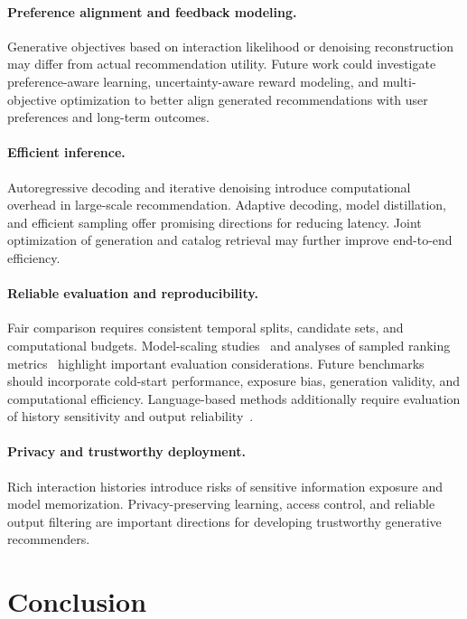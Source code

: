 \documentclass[sigconf,nonacm]{acmart}
\begin{document}
\paragraph{Preference alignment and feedback modeling.}
Generative objectives based on interaction likelihood
or denoising reconstruction may differ from actual
recommendation utility. Future work could investigate
preference-aware learning, uncertainty-aware reward
modeling, and multi-objective optimization to better
align generated recommendations with user preferences
and long-term outcomes.

\paragraph{Efficient inference.}
Autoregressive decoding and iterative denoising introduce
computational overhead in large-scale recommendation.
Adaptive decoding, model distillation, and efficient
sampling offer promising directions for reducing latency.
Joint optimization of generation and catalog retrieval
may further improve end-to-end efficiency.

\paragraph{Reliable evaluation and reproducibility.}
Fair comparison requires consistent temporal splits,
candidate sets, and computational budgets.
Model-scaling studies~\cite{scaling} and analyses of
sampled ranking metrics~\cite{samplemetrics} highlight
important evaluation considerations. Future benchmarks
should incorporate cold-start performance, exposure bias,
generation validity, and computational efficiency.
Language-based methods additionally require evaluation
of history sensitivity and output reliability~\cite{beyondutility}.

\paragraph{Privacy and trustworthy deployment.}
Rich interaction histories introduce risks of sensitive
information exposure and model memorization.
Privacy-preserving learning, access control, and
reliable output filtering are important directions
for developing trustworthy generative recommenders.



\section{Conclusion}
\label{sec:conclusion}
\end{document}
